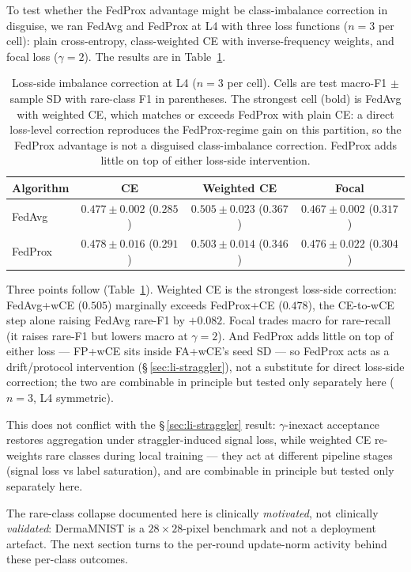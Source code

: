 \documentclass[11pt,a4paper]{report}
\begin{document}
To test whether the FedProx advantage might be class-imbalance correction
in disguise, we ran FedAvg and FedProx at L4 with three loss functions
($n=3$ per cell): plain cross-entropy, class-weighted CE with
inverse-frequency weights, and focal loss ($\gamma = 2$). The results are
in Table~\ref{tab:loss-side}.

\begin{table}[H]
\centering
\caption{Loss-side imbalance correction at L4 ($n=3$ per cell). Cells are
test macro-F1 $\pm$ sample SD with rare-class F1 in parentheses. The
strongest cell (bold) is FedAvg with weighted CE, which matches or exceeds
FedProx with plain CE: a direct loss-level correction reproduces the
FedProx-regime gain on this partition, so the FedProx advantage is not a
disguised class-imbalance correction. FedProx adds little on top of either
loss-side intervention.}
\label{tab:loss-side}
\begin{tabular}{lccc}
\hline
Algorithm & CE & Weighted CE & Focal \\
\hline
FedAvg  & $0.477 \pm 0.002$ ($0.285$) & $\mathbf{0.505 \pm 0.023}$ ($\mathbf{0.367}$) & $0.467 \pm 0.002$ ($0.317$) \\
FedProx & $0.478 \pm 0.016$ ($0.291$) & $0.503 \pm 0.014$ ($0.346$)                   & $0.476 \pm 0.022$ ($0.304$) \\
\hline
\end{tabular}
\end{table}

Three points follow (Table~\ref{tab:loss-side}). Weighted CE is the strongest
loss-side correction: FedAvg+wCE ($0.505$) marginally exceeds FedProx+CE
($0.478$), the CE-to-wCE step alone raising FedAvg rare-F1 by $+0.082$. Focal
trades macro for rare-recall (it raises rare-F1 but lowers macro at $\gamma=2$).
And FedProx adds little on top of either loss --- FP+wCE sits inside FA+wCE's
seed SD --- so FedProx acts as a drift/protocol intervention
(\S\,\ref{sec:li-straggler}), not a substitute for direct loss-side correction;
the two are combinable in principle but tested only separately here ($n=3$, L4
symmetric).

This does not conflict with the \S\,\ref{sec:li-straggler} result:
$\gamma$-inexact acceptance restores aggregation under straggler-induced signal
loss, while weighted CE re-weights rare classes during local training --- they
act at different pipeline stages (signal loss vs label saturation), and are
combinable in principle but tested only separately here.

The rare-class collapse documented here is clinically \emph{motivated},
not clinically \emph{validated}: DermaMNIST is a $28 \times 28$-pixel
benchmark and not a deployment artefact. The next section turns to the
per-round update-norm activity behind these per-class outcomes.
\end{document}
